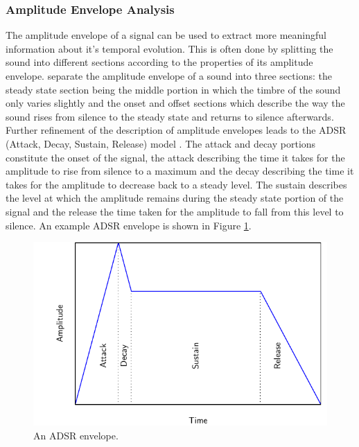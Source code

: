 		\subsubsection*{Amplitude Envelope Analysis}
			The amplitude envelope of a signal can be used to extract more meaningful information about it's
			temporal evolution. This is often done by splitting the sound into different sections according to
			the properties of its amplitude envelope. \citet{howard2009acoustics} separate the amplitude
			envelope of a sound into three sections: the steady state section being the middle portion in which
			the timbre of the sound only varies slightly and the onset and offset sections which describe the
			way the sound rises from silence to the steady state and returns to silence afterwards. Further
			refinement of the description of amplitude envelopes leads to the ADSR (Attack, Decay, Sustain,
			Release) model \citep{descrivan2012music}. The attack and decay portions constitute the onset of
			the signal, the attack describing the time it takes for the amplitude to rise from silence to a
			maximum and the decay describing the time it takes for the amplitude to decrease back to a steady
			level. The sustain describes the level at which the amplitude remains during the steady state
			portion of the signal and the release the time taken for the amplitude to fall from this level to
			silence. An example ADSR envelope is shown in Figure \ref{fig:ADSR}.

			\begin{figure}[h!]
				\centering
				\includegraphics{chapter2/Images/ADSR.pdf}
				\caption{An ADSR envelope.}
				\label{fig:ADSR}
			\end{figure}

